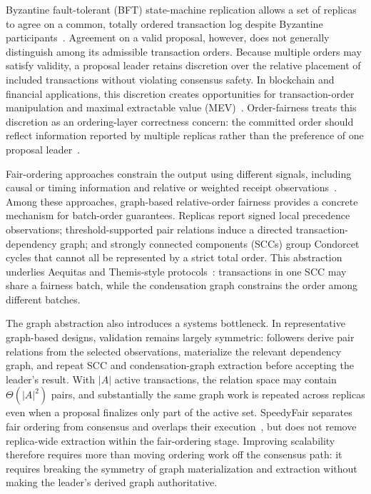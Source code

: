 Byzantine fault-tolerant (BFT) state-machine replication allows a set of
replicas to agree on a common, totally ordered transaction log despite
Byzantine participants~\cite{schneider1990implementing,xu2023survey,
zhang2024reaching,
castro1999practical,yin2019hotstuff}.  Agreement on a valid proposal, however,
does not generally distinguish among its admissible transaction orders.
Because multiple orders may satisfy validity, a proposal leader retains
discretion over the relative placement of included transactions without
violating consensus safety.  In blockchain and financial applications, this
discretion creates opportunities for transaction-order manipulation and
maximal extractable value (MEV)~\cite{daian2020flash,eskandari2019sok,
gramoli2024resilience,
qin2022quantifying,zhou2021high,baum2022sok,heimbach2022eliminating,
heimbach2024non}.  Order-fairness treats this discretion as an ordering-layer
correctness concern: the committed order should reflect information reported
by multiple replicas rather than the preference of one proposal
leader~\cite{kelkar2020order,orda2021enforcing,kiayias2024ordering,
cachin2022quick,kelkar2022order,zhang2020byzantine,kursawe2020wendy,
li2024sok,chen2024auncel}.

Fair-ordering approaches constrain the output using different signals,
including causal or timing information and relative or weighted receipt
observations~\cite{kelkar2022orderfair,kursawe2020wendy,zhang2020byzantine,
chen2024auncel}.  Among these approaches, graph-based relative-order fairness
provides a concrete mechanism for batch-order guarantees.  Replicas report
signed local precedence observations; threshold-supported pair relations
induce a directed transaction-dependency graph; and strongly connected
components (SCCs) group Condorcet cycles that cannot all be represented by a
strict total order.  This abstraction underlies Aequitas and Themis-style
protocols~\cite{kelkar2020order,kelkar2023themis}: transactions in one SCC may
share a fairness batch, while the condensation graph constrains the order
among different batches.

The graph abstraction also introduces a systems bottleneck.  In representative
graph-based designs, validation remains largely symmetric: followers derive
pair relations from the selected observations, materialize the relevant
dependency graph, and repeat SCC and condensation-graph extraction before
accepting the leader's result.  With $|A|$ active transactions, the relation
space may contain $\Theta(|A|^2)$ pairs, and substantially the same graph work
is repeated across replicas even when a proposal finalizes only part of the
active set.  SpeedyFair separates fair ordering from consensus and overlaps
their execution~\cite{mu2024separation}, but does not remove replica-wide
extraction within the fair-ordering stage.  Improving scalability therefore
requires more than moving ordering work off the consensus path: it requires
breaking the symmetry of graph materialization and extraction without making
the leader's derived graph authoritative.

